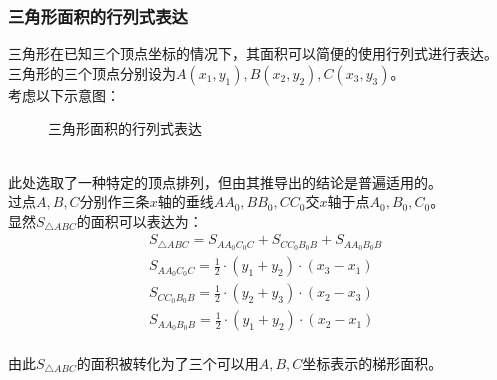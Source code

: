 \documentclass[UTF8]{ctexart}
\begin{document}
\subsubsection{三角形面积的行列式表达}
    \setcounter{equation}{0}
    三角形在已知三个顶点坐标的情况下，其面积可以简便的使用行列式进行表达。\\[3mm]
    三角形的三个顶点分别设为$A(x_1,y_1),B(x_2,y_2),C(x_3,y_3)$。\\[3mm]
    考虑以下示意图：
    \begin{figure}[h]
        \begin{center}
            \caption{三角形面积的行列式表达}
        \end{center}
    \end{figure}\\
    此处选取了一种特定的顶点排列，但由其推导出的结论是普遍适用的。\\[3mm]
    过点$A,B,C$分别作三条$x$轴的垂线$AA_0,BB_0,CC_0$交$x$轴于点$A_0,B_0,C_0$。\\[3mm]
    显然$S_{\triangle ABC}$的面积可以表达为：
    \begin{align}
        &S_{\triangle ABC}=S_{AA_0C_0C}+S_{CC_0B_0B}+S_{AA_0B_0B}\\[6mm]
        &S_{AA_0C_0C}=\frac{1}{2}\cdot(y_1+y_2)\cdot(x_3-x_1)\\[6mm]
        &S_{CC_0B_0B}=\frac{1}{2}\cdot(y_2+y_3)\cdot(x_2-x_3)\\[6mm]
        &S_{AA_0B_0B}=\frac{1}{2}\cdot(y_1+y_2)\cdot(x_2-x_1)
    \end{align}\\
    由此$S_{\triangle ABC}$的面积被转化为了三个可以用$A,B,C$坐标表示的梯形面积。
\end{document}
